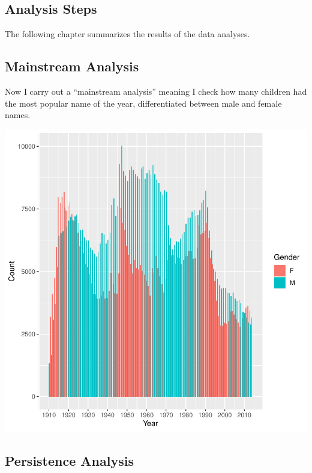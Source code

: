 \documentclass[11pt,preprint]{elsarticle}
\let\origfigure\figure
\let\endorigfigure\endfigure
\renewenvironment{figure}[1][2] {
    \expandafter\origfigure\expandafter[H]
} {
    \endorigfigure
}
\numberwithin{equation}{section}
\numberwithin{figure}{section}
\numberwithin{table}{section}
\begin{document}
\subsection{Analysis Steps}\label{analysis-steps}

The following chapter summarizes the results of the data analyses.

\subsection{Mainstream Analysis}\label{mainstream-analysis}

Now I carry out a ``mainstream analysis'' meaning I check how many
children had the most popular name of the year, differentiated between
male and female names.

\begin{figure}
\centering
\includegraphics{Task_1_ReadMe_files/figure-latex/unnamed-chunk-3-1.pdf}
\caption{Mainstream Analysis}
\end{figure}

\subsection{Persistence Analysis}\label{persistence-analysis}
\end{document}
